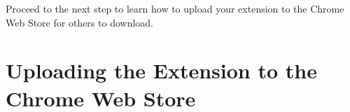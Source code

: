 \documentclass[11pt]{article}
\begin{document}
Proceed to the next step to learn how to upload your extension to the Chrome Web Store for others to download.

\newpage

\section{Uploading the Extension to the Chrome Web Store}
\end{document}
